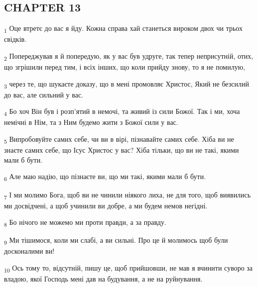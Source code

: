 \subsection{CHAPTER 13}
\begin{tcolorbox}
\textsubscript{1} Оце втретє до вас я йду. Кожна справа хай станеться вироком двох чи трьох свідків.
\end{tcolorbox}
\begin{tcolorbox}
\textsubscript{2} Попереджував я й попередую, як у вас був удруге, так тепер неприсутній, отих, що згрішили перед тим, і всіх інших, що коли прийду знову, то я не помилую,
\end{tcolorbox}
\begin{tcolorbox}
\textsubscript{3} через те, що шукаєте доказу, що в мені промовляє Христос, Який не безсилий до вас, але сильний у вас.
\end{tcolorbox}
\begin{tcolorbox}
\textsubscript{4} Бо хоч Він був і розп'ятий в немочі, та живий із сили Божої. Так і ми, хоча немічні в Нім, та з Ним будемо жити з Божої сили у вас.
\end{tcolorbox}
\begin{tcolorbox}
\textsubscript{5} Випробовуйте самих себе, чи ви в вірі, пізнавайте самих себе. Хіба ви не знаєте самих себе, що Ісус Христос у вас? Хіба тільки, що ви не такі, якими мали б бути.
\end{tcolorbox}
\begin{tcolorbox}
\textsubscript{6} Але маю надію, що пізнаєте ви, що ми такі, якими мали б бути.
\end{tcolorbox}
\begin{tcolorbox}
\textsubscript{7} І ми молимо Бога, щоб ви не чинили ніякого лиха, не для того, щоб виявились ми досвідчені, а щоб учинили ви добре, а ми будем немов негідні.
\end{tcolorbox}
\begin{tcolorbox}
\textsubscript{8} Бо нічого не можемо ми проти правди, а за правду.
\end{tcolorbox}
\begin{tcolorbox}
\textsubscript{9} Ми тішимося, коли ми слабі, а ви сильні. Про це й молимось щоб були досконалими ви!
\end{tcolorbox}
\begin{tcolorbox}
\textsubscript{10} Ось тому то, відсутній, пишу це, щоб прийшовши, не мав я вчинити суворо за владою, якої Господь мені дав на будування, а не на руйнування.
\end{tcolorbox}
